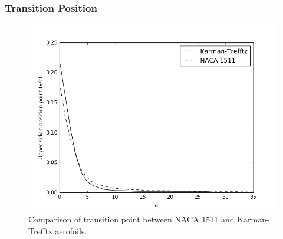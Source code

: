 \documentclass[10pt,a4paper]{article}
\begin{document}
\subsubsection{Transition Position}
\begin{figure}[!htb]
\centering
\includegraphics[scale=0.75]{Figures/transition_comparison.png}
\caption{Comparison of transition point between NACA 1511 and Karman-Trefftz aerofoils.}
\label{fig:transition_comparison}
\end{figure}
\end{document}
